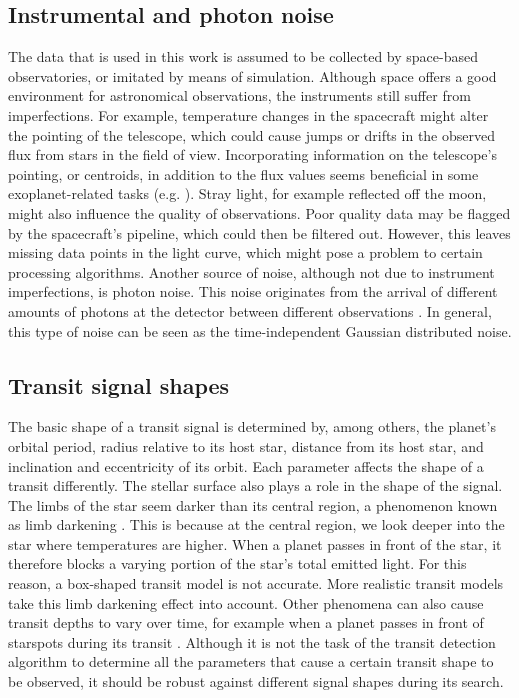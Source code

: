 \subsection{Instrumental and photon noise}
The data that is used in this work is assumed to be collected by space-based observatories, or imitated by means of simulation. Although space offers a good environment for astronomical observations, the instruments still suffer from imperfections. For example, temperature changes in the spacecraft might alter the pointing of the telescope, which could cause jumps or drifts in the observed flux from stars in the field of view. Incorporating information on the telescope’s pointing, or centroids, in addition to the flux values seems beneficial in some exoplanet-related tasks (e.g. \cite{osborn2020rapid, morvan2020detrending}).  Stray light, for example reflected off the moon, might also influence the quality of observations. Poor quality data may be flagged by the spacecraft’s pipeline, which could then be filtered out. However, this leaves missing data points in the light curve, which might pose a problem to certain processing algorithms. 
Another source of noise, although not due to instrument imperfections, is photon noise. This noise originates from the arrival of different amounts of photons at the detector between different observations \citep{hasinoff2014photon}. In general, this type of noise can be seen as the time-independent Gaussian distributed noise.

\subsection{Transit signal shapes}
\label{sec:transit_shapes}

The basic shape of a transit signal is determined by, among others, the planet’s orbital period, radius relative to its host star, distance from its host star, and inclination and eccentricity of its orbit. Each parameter affects the shape of a transit differently. The stellar surface also plays a role in the shape of the signal. The limbs of the star seem darker than its central region, a phenomenon known as limb darkening \citep{claret2000new}. This is because at the central region, we look deeper into the star where temperatures are higher. When a planet passes in front of the star, it therefore blocks a varying portion of the star’s total emitted light. For this reason, a box-shaped transit model is not accurate. More realistic transit models take this limb darkening effect into account. Other phenomena can also cause transit depths to vary over time, for example when a planet passes in front of starspots during its transit \citep{llama2015transiting}. Although it is not the task of the transit detection algorithm to determine all the parameters that cause a certain transit shape to be observed, it should be robust against different signal shapes during its search.

